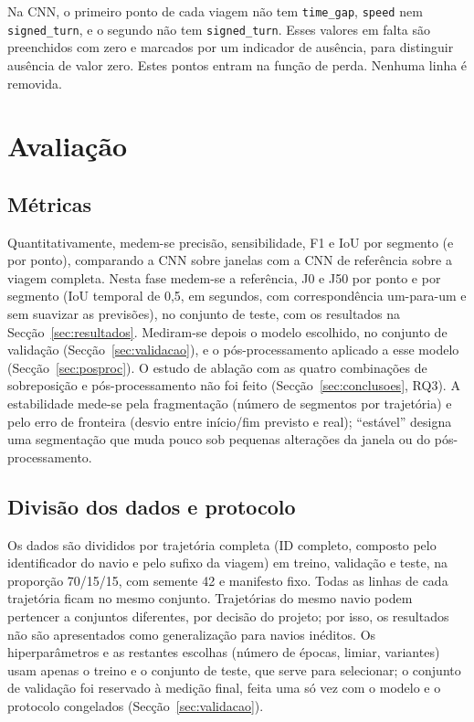 \documentclass{article}
\newcommand{\revtext}[2]{{\color{#1}#2}}
\begin{document}
Na CNN, o primeiro ponto de cada viagem não tem \texttt{time\_gap}, \texttt{speed} nem \texttt{signed\_turn}, e o segundo não tem \texttt{signed\_turn}. Esses valores em falta são preenchidos com zero e marcados por um indicador de ausência, para distinguir ausência de valor zero. Estes pontos entram na função de perda. Nenhuma linha é removida.

\section{Avaliação}
\label{sec:avaliacao}

\subsection{\texorpdfstring{\revtext{rev062}{Métricas}}{Métricas}}
\label{sec:avaliacao-metricas}

Quantitativamente, medem-se precisão, sensibilidade, F1 e IoU por segmento (e por ponto), \revtext{rev042}{comparando a CNN sobre janelas com a CNN de referência sobre a viagem completa}. \revtext{rev047}{Nesta fase medem-se a referência, J0 e J50 por ponto e por segmento (IoU temporal de 0,5, em segundos, com correspondência um-para-um e sem suavizar as previsões), no conjunto de teste, com os resultados na Secção~\ref{sec:resultados}.} \revtext{rev062}{Mediram-se depois o modelo escolhido, no conjunto de validação (Secção~\ref{sec:validacao}), e o pós-processamento aplicado a esse modelo (Secção~\ref{sec:posproc}). O estudo de ablação com as quatro combinações de sobreposição e pós-processamento não foi feito (Secção~\ref{sec:conclusoes}, RQ3).} A estabilidade mede-se pela fragmentação (número de segmentos por trajetória) e pelo erro de fronteira (desvio entre início/fim previsto e real); ``estável'' designa uma segmentação que muda pouco sob pequenas alterações da janela ou do pós-processamento.

\subsection{\texorpdfstring{Divisão dos dados e protocolo}{Divisão dos dados e protocolo}}
\label{sec:avaliacao-protocolo}

Os dados são divididos por trajetória completa (ID completo, composto pelo identificador do navio e pelo sufixo da viagem) em treino, validação e teste, na proporção 70/15/15, com semente 42 e manifesto fixo. Todas as linhas de cada trajetória ficam no mesmo conjunto. Trajetórias do mesmo navio podem pertencer a conjuntos diferentes, por decisão do projeto; por isso, os resultados não são apresentados como generalização para navios inéditos. Os hiperparâmetros e as restantes escolhas (número de épocas, limiar, variantes) usam apenas o treino e o conjunto de teste, que serve para selecionar; \revtext{rev053}{o conjunto de validação foi reservado à medição final, feita uma só vez com o modelo e o protocolo congelados (Secção~\ref{sec:validacao}).}
\end{document}
